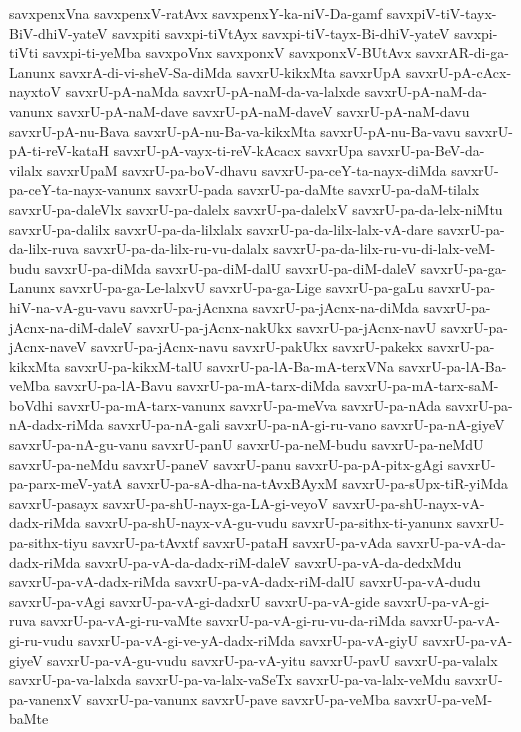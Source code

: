 {savxpenxVna
savxpenxV-ratAvx
savxpenxY-ka-niV-Da-gamf
savxpiV-tiV-tayx-BiV-dhiV-yateV
savxpiti
savxpi-tiVtAyx
savxpi-tiV-tayx-Bi-dhiV-yateV
savxpi-tiVti
savxpi-ti-yeMba
savxpoVnx
savxponxV
savxponxV-BUtAvx
savxrAR-di-ga-Lanunx
savxrA-di-vi-sheV-Sa-diMda
savxrU-kikxMta
savxrUpA
savxrU-pA-cAcx-nayxtoV
savxrU-pA-naMda
savxrU-pA-naM-da-va-lalxde
savxrU-pA-naM-da-vanunx
savxrU-pA-naM-dave
savxrU-pA-naM-daveV
savxrU-pA-naM-davu
savxrU-pA-nu-Bava
savxrU-pA-nu-Ba-va-kikxMta
savxrU-pA-nu-Ba-vavu
savxrU-pA-ti-reV-kataH
savxrU-pA-vayx-ti-reV-kAcacx
savxrUpa
savxrU-pa-BeV-da-vilalx
savxrUpaM
savxrU-pa-boV-dhavu
savxrU-pa-ceY-ta-nayx-diMda
savxrU-pa-ceY-ta-nayx-vanunx
savxrU-pada
savxrU-pa-daMte
savxrU-pa-daM-tilalx
savxrU-pa-daleVlx
savxrU-pa-dalelx
savxrU-pa-dalelxV
savxrU-pa-da-lelx-niMtu
savxrU-pa-dalilx
savxrU-pa-da-lilxlalx
savxrU-pa-da-lilx-lalx-vA-dare
savxrU-pa-da-lilx-ruva
savxrU-pa-da-lilx-ru-vu-dalalx
savxrU-pa-da-lilx-ru-vu-di-lalx-veM-budu
savxrU-pa-diMda
savxrU-pa-diM-dalU
savxrU-pa-diM-daleV
savxrU-pa-ga-Lanunx
savxrU-pa-ga-Le-lalxvU
savxrU-pa-ga-Lige
savxrU-pa-gaLu
savxrU-pa-hiV-na-vA-gu-vavu
savxrU-pa-jAcnxna
savxrU-pa-jAcnx-na-diMda
savxrU-pa-jAcnx-na-diM-daleV
savxrU-pa-jAcnx-nakUkx
savxrU-pa-jAcnx-navU
savxrU-pa-jAcnx-naveV
savxrU-pa-jAcnx-navu
savxrU-pakUkx
savxrU-pakekx
savxrU-pa-kikxMta
savxrU-pa-kikxM-talU
savxrU-pa-lA-Ba-mA-terxVNa
savxrU-pa-lA-Ba-veMba
savxrU-pa-lA-Bavu
savxrU-pa-mA-tarx-diMda
savxrU-pa-mA-tarx-saM-boVdhi
savxrU-pa-mA-tarx-vanunx
savxrU-pa-meVva
savxrU-pa-nAda
savxrU-pa-nA-dadx-riMda
savxrU-pa-nA-gali
savxrU-pa-nA-gi-ru-vano
savxrU-pa-nA-giyeV
savxrU-pa-nA-gu-vanu
savxrU-panU
savxrU-pa-neM-budu
savxrU-pa-neMdU
savxrU-pa-neMdu
savxrU-paneV
savxrU-panu
savxrU-pa-pA-pitx-gAgi
savxrU-pa-parx-meV-yatA
savxrU-pa-sA-dha-na-tAvxBAyxM
savxrU-pa-sUpx-tiR-yiMda
savxrU-pasayx
savxrU-pa-shU-nayx-ga-LA-gi-veyoV
savxrU-pa-shU-nayx-vA-dadx-riMda
savxrU-pa-shU-nayx-vA-gu-vudu
savxrU-pa-sithx-ti-yanunx
savxrU-pa-sithx-tiyu
savxrU-pa-tAvxtf
savxrU-pataH
savxrU-pa-vAda
savxrU-pa-vA-da-dadx-riMda
savxrU-pa-vA-da-dadx-riM-daleV
savxrU-pa-vA-da-dedxMdu
savxrU-pa-vA-dadx-riMda
savxrU-pa-vA-dadx-riM-dalU
savxrU-pa-vA-dudu
savxrU-pa-vAgi
savxrU-pa-vA-gi-dadxrU
savxrU-pa-vA-gide
savxrU-pa-vA-gi-ruva
savxrU-pa-vA-gi-ru-vaMte
savxrU-pa-vA-gi-ru-vu-da-riMda
savxrU-pa-vA-gi-ru-vudu
savxrU-pa-vA-gi-ve-yA-dadx-riMda
savxrU-pa-vA-giyU
savxrU-pa-vA-giyeV
savxrU-pa-vA-gu-vudu
savxrU-pa-vA-yitu
savxrU-pavU
savxrU-pa-valalx
savxrU-pa-va-lalxda
savxrU-pa-va-lalx-vaSeTx
savxrU-pa-va-lalx-veMdu
savxrU-pa-vanenxV
savxrU-pa-vanunx
savxrU-pave
savxrU-pa-veMba
savxrU-pa-veM-baMte
}
